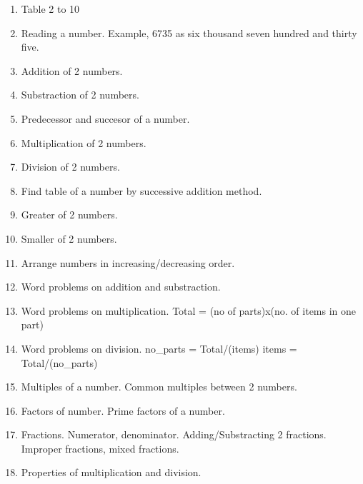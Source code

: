 
\begin{enumerate}
    \item Table 2 to 10
    \item Reading a number. Example, 6735 as six thousand seven hundred and thirty five.
    \item Addition of 2 numbers.
    \item Substraction of 2 numbers.
    \item Predecessor and succesor of a number.
    \item Multiplication of 2 numbers.
    \item Division of 2 numbers.
    \item Find table of a number by successive addition method.
    \item Greater of 2 numbers.
    \item Smaller of 2 numbers.
    \item Arrange numbers in increasing/decreasing order.
    \item Word problems on addition and substraction.
    \item Word problems on multiplication. Total = (no of parts)x(no. of items in one part)
    \item Word problems on division. no_parts = Total/(items) \qquad  items = Total/(no_parts)
    \item Multiples of a number. Common multiples between 2 numbers.
    \item Factors of number. Prime factors of a number.
    \item Fractions. Numerator, denominator. Adding/Substracting 2 fractions. Improper fractions, mixed fractions.
    \item Properties of multiplication and division.
\end{enumerate}

